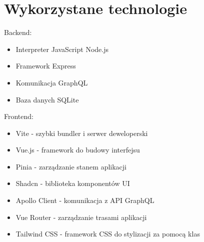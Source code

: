 \documentclass{article}
\begin{document}
    \section{Wykorzystane technologie}
        Backend:
        \begin{itemize}
            \item Interpreter JavaScript Node.js
            \item Framework Express
            \item Komunikacja GraphQL
            \item Baza danych SQLite
        \end{itemize}
        Frontend:
        \begin{itemize}
            \item Vite - szybki bundler i serwer deweloperski
            \item Vue.js - framework do budowy interfejsu
            \item Pinia - zarządzanie stanem aplikacji
            \item Shadcn - biblioteka komponentów UI
            \item Apollo Client - komunikacja z API GraphQL
            \item Vue Router - zarządzanie trasami aplikacji
            \item Tailwind CSS - framework CSS do stylizacji za pomocą klas
        \end{itemize}
\end{document}
